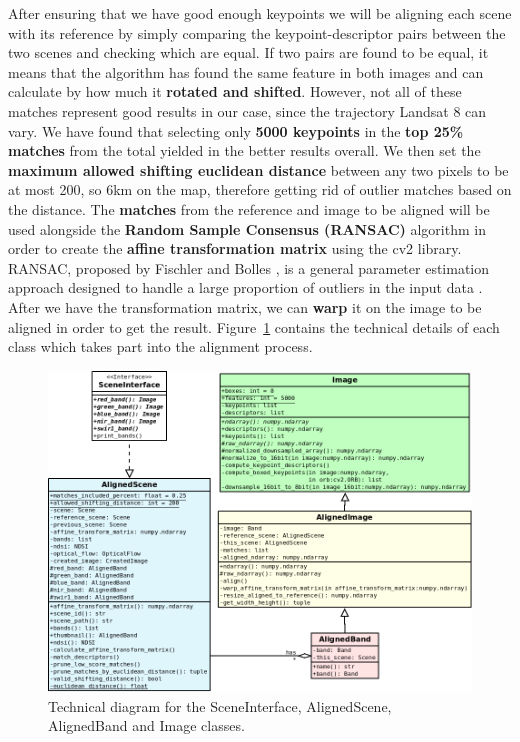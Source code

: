 \documentclass[11pt, a4paper]{report}
\begin{document}
	After ensuring that we have good enough keypoints we will be aligning each scene with its reference by simply comparing the keypoint-descriptor pairs between the two scenes and checking which are equal. If two pairs are found to be equal, it means that the algorithm has found the same feature in both images and can calculate by how much it \textbf{rotated and shifted}. However, not all of these matches represent good results in our case, since the trajectory Landsat 8 can vary. We have found that selecting only \textbf{5000 keypoints} in the \textbf{top 25\% matches} from the total yielded in the better results overall. We then set the \textbf{maximum allowed shifting euclidean distance} between any two pixels to be at most 200, so 6km on the map, therefore getting rid of outlier matches based on the distance.
	The \textbf{matches} from the reference and image to be aligned will be used alongside the \textbf{Random Sample Consensus (RANSAC)} algorithm in order to create the \textbf{affine transformation matrix} using the cv2 library. RANSAC, proposed by Fischler and Bolles \cite{ransac}, is a general parameter estimation approach designed to handle a large proportion of outliers in the input data \cite{ransac2}. After we have the transformation matrix, we can \textbf{warp} it on the image to be aligned in order to get the result. Figure~\ref{fig:alignment_diagram} contains the technical details of each class which takes part into the alignment process.
	\begin{figure}[h]
		\centering
		\includegraphics[scale=0.45]{../images/alignment_diagram.png}
		\caption{Technical diagram for the SceneInterface, AlignedScene, AlignedBand and Image classes.}
		\label{fig:alignment_diagram}
	\end{figure}
\end{document}
